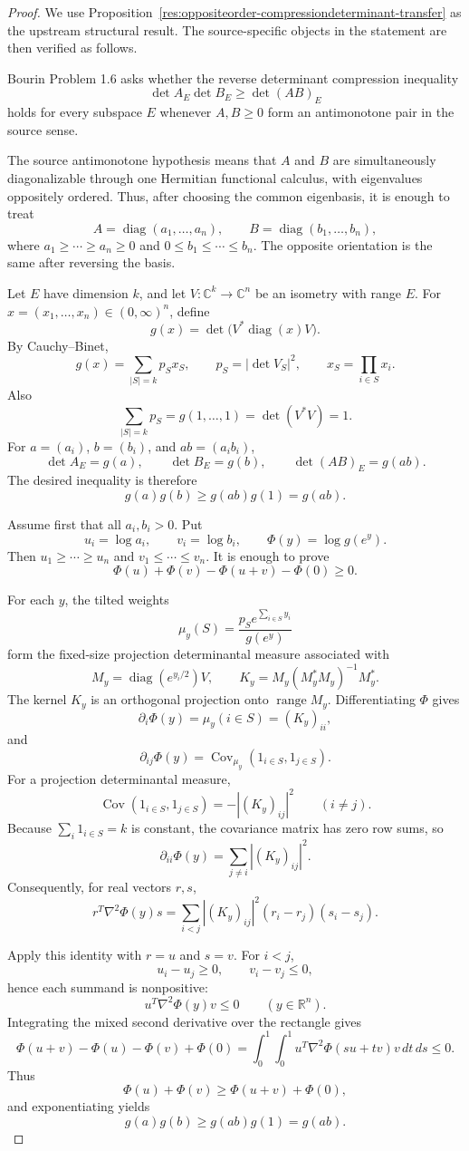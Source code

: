 \documentclass[11pt]{article}
\numberwithin{equation}{section}
\theoremstyle{definition}
\theoremstyle{remark}
\newcommand{\1}{\mathbf 1}
\begin{document}
\begin{proof}
We use Proposition~\ref{res:oppositeorder-compressiondeterminant-transfer} as the upstream structural result. The source-specific objects in the statement are then verified as follows.

Bourin Problem 1.6 asks whether the reverse determinant compression inequality
\[
\det A_E\det B_E\ge \det(AB)_E
\]
holds for every subspace \(E\) whenever \(A,B\ge0\) form an antimonotone pair in the source sense.

The source antimonotone hypothesis means that \(A\) and \(B\) are simultaneously diagonalizable through one Hermitian functional calculus, with eigenvalues oppositely ordered. Thus, after choosing the common eigenbasis, it is enough to treat
\[
A=\operatorname{diag}(a_1,\ldots,a_n),\qquad
B=\operatorname{diag}(b_1,\ldots,b_n),
\]
where \(a_1\ge\cdots\ge a_n\ge0\) and \(0\le b_1\le\cdots\le b_n\). The opposite orientation is the same after reversing the basis.

Let \(E\) have dimension \(k\), and let \(V:\mathbb C^k\to\mathbb C^n\) be an isometry with range \(E\). For \(x=(x_1,\ldots,x_n)\in(0,\infty)^n\), define
\[
g(x)=\det\bigl(V^*\operatorname{diag}(x)V\bigr).
\]
By Cauchy--Binet,
\[
g(x)=\sum_{|S|=k}p_S x_S,\qquad
p_S=|\det V_S|^2,\qquad
x_S=\prod_{i\in S}x_i.
\]
Also
\[
\sum_{|S|=k}p_S=g(1,\ldots,1)=\det(V^*V)=1.
\]
For \(a=(a_i)\), \(b=(b_i)\), and \(ab=(a_i b_i)\),
\[
\det A_E=g(a),\qquad
\det B_E=g(b),\qquad
\det(AB)_E=g(ab).
\]
The desired inequality is therefore
\[
g(a)g(b)\ge g(ab)g(1)=g(ab).
\]

Assume first that all \(a_i,b_i>0\). Put
\[
u_i=\log a_i,\qquad v_i=\log b_i,\qquad
\Phi(y)=\log g(e^y).
\]
Then \(u_1\ge\cdots\ge u_n\) and \(v_1\le\cdots\le v_n\). It is enough to prove
\[
\Phi(u)+\Phi(v)-\Phi(u+v)-\Phi(0)\ge0.
\]

For each \(y\), the tilted weights
\[
\mu_y(S)=\frac{p_S e^{\sum_{i\in S}y_i}}{g(e^y)}
\]
form the fixed-size projection determinantal measure associated with
\[
M_y=\operatorname{diag}(e^{y_i/2})V,\qquad
K_y=M_y(M_y^*M_y)^{-1}M_y^*.
\]
The kernel \(K_y\) is an orthogonal projection onto \(\operatorname{range} M_y\). Differentiating \(\Phi\) gives
\[
\partial_i\Phi(y)=\mu_y(i\in S)=(K_y)_{ii},
\]
and
\[
\partial_{ij}\Phi(y)=\operatorname{Cov}_{\mu_y}(1_{i\in S},1_{j\in S}).
\]
For a projection determinantal measure,
\[
\operatorname{Cov}(1_{i\in S},1_{j\in S})=-|(K_y)_{ij}|^2\qquad(i\ne j).
\]
Because \(\sum_i1_{i\in S}=k\) is constant, the covariance matrix has zero row sums, so
\[
\partial_{ii}\Phi(y)=\sum_{j\ne i}|(K_y)_{ij}|^2.
\]
Consequently, for real vectors \(r,s\),
\[
r^T\nabla^2\Phi(y)s
=\sum_{i<j}|(K_y)_{ij}|^2(r_i-r_j)(s_i-s_j).
\]

Apply this identity with \(r=u\) and \(s=v\). For \(i<j\),
\[
u_i-u_j\ge0,\qquad v_i-v_j\le0,
\]
hence each summand is nonpositive:
\[
u^T\nabla^2\Phi(y)v\le0\qquad(y\in\mathbb R^n).
\]
Integrating the mixed second derivative over the rectangle gives
\[
\Phi(u+v)-\Phi(u)-\Phi(v)+\Phi(0)
=\int_0^1\int_0^1
u^T\nabla^2\Phi(su+tv)v\,dt\,ds
\le0.
\]
Thus
\[
\Phi(u)+\Phi(v)\ge \Phi(u+v)+\Phi(0),
\]
and exponentiating yields
\[
g(a)g(b)\ge g(ab)g(1)=g(ab).
\]
\end{proof}
\end{document}
